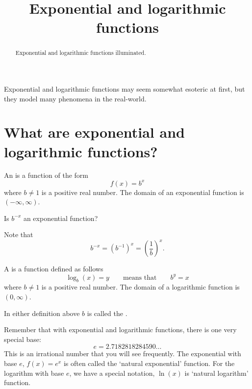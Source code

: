 \documentclass{ximera}
\title[Dig-In:]{Exponential and logarithmic functions}
\begin{document}
\begin{abstract}
  Exponential and logarithmic functions illuminated.
\end{abstract}
\maketitle

Exponential and logarithmic functions may seem somewhat esoteric at
first, but they model many phenomena in the real-world.




\section{What are exponential and logarithmic functions?}


\begin{definition}
  An  is a function of the form
  \[
  f(x) = b^x
  \]
  where  $b\neq 1$ is a positive real number. The domain of an
  exponential function is $(-\infty,\infty)$.
\end{definition}

\begin{question}
  Is $b^{-x}$ an exponential function?
  \begin{prompt}
  \begin{multipleChoice}
  \end{multipleChoice}
  \end{prompt}
  \begin{feedback}
    Note that
    \[
    b^{-x} = \left(b^{-1}\right)^x = \left(\frac{1}{b}\right)^x.
    \]
  \end{feedback}
\end{question}



\begin{definition}
  A  is a function defined as follows
  \[
  \log_b(x) = y \qquad\text{means that}\qquad b^y = x
  \]
  where  $b\ne 1$ is a positive real number. The domain of a
  logarithmic function is $(0,\infty)$.
\end{definition}

In either definition above $b$ is called the .

Remember that with exponential and logarithmic functions, there is one very special
base:
\[ e = 2.7182818284590\ldots \]
This is an irrational number that you will see frequently.  The exponential with base $e$,
$f(x) = e^x$ is often called the `natural exponential' function.  For the logarithm with base $e$,
we have a special notation, $\ln(x)$ is `natural logarithm' function.
\end{document}
